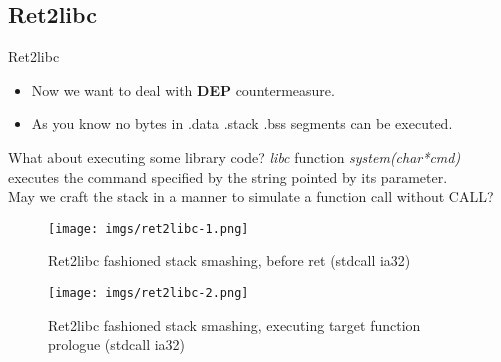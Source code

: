 \subsection{Ret2libc}
\begin{frame}{Ret2libc}

\begin{itemize}
\item Now we want to deal with {\bf DEP} countermeasure.
\item As you know no bytes in .data .stack .bss segments can be executed.
\end{itemize}

\begin{block}{What about executing some library code?}
\emph{libc} function \emph{system(char*cmd)} executes the command specified by the string pointed by its parameter. \\
May we craft the stack in a manner to simulate a function call without CALL?
\end{block}

\framebreak
	\begin{figure}
        \texttt{[image: imgs/ret2libc-1.png]}
        \label{fig:ret2libc-1}
        \caption{Ret2libc fashioned stack smashing, before ret (stdcall ia32)}
    \end{figure}	
\framebreak
	\begin{figure}
        \texttt{[image: imgs/ret2libc-2.png]}
        \label{fig:ret2libc-2}
        \caption{Ret2libc fashioned stack smashing, executing target function prologue (stdcall ia32)}
    \end{figure}

\end{frame}


